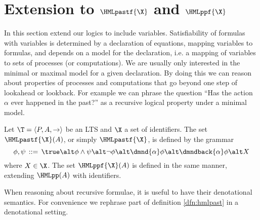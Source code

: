 \section{Extension to $\HMLpastf{\X}$ and $\HMLppf{\X}$}

\cite{}

In this section extend our logics to include variables. Satisfiability of 
formulas with variables is determined by a declaration of equations,
mapping variables to formulas, and depends on a model for the declaration,
i.e. a mapping of variables to sets of processes (or computations). We
are usually only interested in the minimal or maximal model for a given
declaration. By doing this we can reason about properties of processes
and computations that go beyond one step of lookahead or lookback. For
example we can phrase the question ``Has the action $\alpha$ ever happened
in the past?'' as a recursive logical property under a minimal model.

\begin{definition}
    Let $\T=\langle P,A,\rightarrow \rangle$ be an LTS and $\X$ a
    set of identifiers. The set $\HMLpastf{\X}(A)$,
    or simply $\HMLpastf{\X}$, is defined by the grammar
    \[
        \phi,\psi \,::=\, \true \alt \phi\land\psi
                                \alt \neg\phi
                                \alt \dmnd{\alpha} \phi
                                \alt \dmndback{\alpha} \phi
                                \alt X
    \]
    where $X\in \X$. The set $\HMLppf{\X}(A)$ is defined in the same manner, 
    extending $\HMLpp(A)$ with identifiers.
\end{definition}

When reasoning about recursive formulae, it is useful to have their denotational
semantics. For convenience we rephrase part of definition \ref{dfn:hmlpast} in a 
denotational setting.

